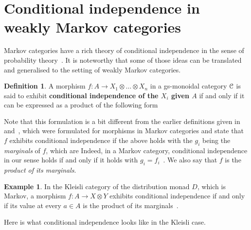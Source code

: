 \documentclass[a4paper,UKenglish,numberwithinsect,cleveref, autoref, thm-restate]{lipics-v2021}
\theoremstyle{plain} %
\theoremstyle{definition} %
\newtheorem{mydefinition}[mytheorem]{Definition}
\newtheorem{myexample}[mytheorem]{Example}
\begin{document}
\section{Conditional independence in weakly Markov categories}
\label{secindep}

Markov categories have a rich theory of conditional independence in the sense of probability theory~\cite{fritz2022dseparation}. 
It is noteworthy that some of those ideas can be translated and generalised to the setting of weakly Markov categories. 

\begin{mydefinition}\label{defcondind}
 A morphism $f:A\to X_1\otimes\dots\otimes X_n$ in a gs-monoidal category $\mathcal{C}$ is said to exhibit \textbf{conditional independence of the $X_i$ given $A$} if and only if it can be expressed as a product of the following form
\end{mydefinition}
%
Note that this formulation is a bit different from the earlier definitions given in \cite[Definition~6.6]{cho_jacobs_2019} and~\cite[Definition~12.12]{Fritz_2020}, which were formulated for morphisms in Markov categories and state that $f$ exhibits conditional independence if the above holds with the $g_i$ being the \emph{marginals} of $f$, which are
Indeed, in a Markov category, conditional independence in our sense holds if and only if it holds with $g_i = f_i$~\cite[Lemma~12.11]{Fritz_2020}.
We also say that $f$ is the \emph{product of its marginals}.

\begin{myexample}
 In the Kleisli category of the distribution monad $D$, which is Markov, a morphism $f:A\to X\otimes Y$ exhibits conditional independence if and only if its value at every $a \in A$ is the product of its marginals~\cite[Section~12]{Fritz_2020}.
\end{myexample}
%
Here is what conditional independence looks like in the Kleisli case.
\end{document}
